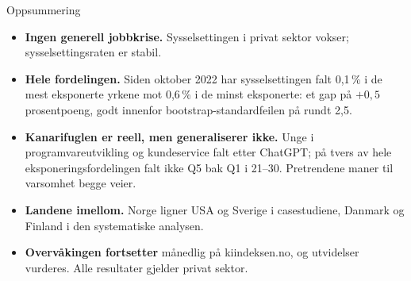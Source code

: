 
\begin{frame}{Oppsummering}
\small
\begin{itemize}\setlength{\itemsep}{5pt}
  \item \textbf{Ingen generell jobbkrise.} Sysselsettingen i privat sektor vokser; sysselsettingsraten er stabil.
  \item \textbf{Hele fordelingen.} Siden oktober 2022 har sysselsettingen falt 0,1\,\% i de mest eksponerte yrkene mot 0,6\,\% i de minst eksponerte: et gap på $+0{,}5$ prosentpoeng, godt innenfor bootstrap-standardfeilen på rundt 2,5.
  \item \textbf{Kanarifuglen er reell, men generaliserer ikke.} Unge i programvareutvikling og kundeservice falt etter ChatGPT; på tvers av hele eksponeringsfordelingen falt ikke Q5 bak Q1 i 21--30. Pretrendene maner til varsomhet begge veier.
  \item \textbf{Landene imellom.} Norge ligner USA og Sverige i casestudiene, Danmark og Finland i den systematiske analysen.
  \item \textbf{Overvåkingen fortsetter} månedlig på kiindeksen.no, og utvidelser vurderes. Alle resultater gjelder privat sektor.
\end{itemize}
\end{frame}
